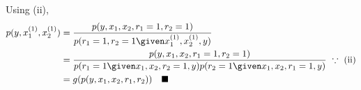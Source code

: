 \newcommand{\und}{^{(1)}}
Using (ii),
\begin{align*}
    p(y, x_1\und, x_2\und)
        &= \frac{p(y, x_1, x_2, r_1=1, r_2=1)}{p(r_1=1, r_2=1 \given x_1\und, x_2\und, y)}\\
            &= \frac{p(y, x_1, x_2, r_1=1, r_2=1)}{p(r_1=1 \given x_1, x_2, r_2=1, y)p(r_2=1 \given x_1, x_2, r_1=1, y)} ~\because ~\text{(ii)}\\
            &= g(p(y, x_1, x_2, r_1, r_2)) ~~~\blacksquare
\end{align*}